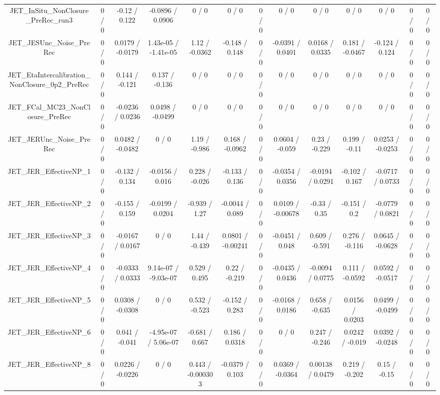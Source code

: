 \documentclass[10pt]{article}
\begin{document}
\begin{table}[htbp]
\begin{center}
\begin{tabular}{|c|c|c|c|c|c|c|c|c|c|c|c|c|}
  JET_InSitu_NonClosure_PreRec_run3 & 0 / 0 & -0.12 / 0.122 & -0.0896 / 0.0906 & 0 / 0 & 0 / 0 & 0 / 0 & 0 / 0 & 0 / 0 & 0 / 0 & 0 / 0 & 0 / 0 & 0 / 0 \\ 
  JET_JESUnc_Noise_PreRec & 0 / 0 & 0.0179 / -0.0179 & 1.43e-05 / -1.41e-05 & 1.12 / -0.0362 & -0.148 / 0.148 & 0 / 0 & -0.0391 / 0.0401 & 0.0168 / 0.0335 & 0.181 / -0.0467 & -0.124 / 0.124 & 0 / 0 & 0 / 0 \\ 
  JET_EtaIntercalibration_NonClosure_0p2_PreRec & 0 / 0 & 0.144 / -0.121 & 0.137 / -0.136 & 0 / 0 & 0 / 0 & 0 / 0 & 0 / 0 & 0 / 0 & 0 / 0 & 0 / 0 & 0 / 0 & 0 / 0 \\ 
  JET_FCal_MC23_NonClosure_PreRec & 0 / 0 & -0.0236 / 0.0236 & 0.0498 / -0.0499 & 0 / 0 & 0 / 0 & 0 / 0 & 0 / 0 & 0 / 0 & 0 / 0 & 0 / 0 & 0 / 0 & 0 / 0 \\ 
  JET_JERUnc_Noise_PreRec & 0 / 0 & 0.0482 / -0.0482 & 0 / 0 & 1.19 / -0.986 & 0.168 / -0.0962 & 0 / 0 & 0.0604 / -0.059 & 0.23 / -0.229 & 0.199 / -0.11 & 0.0253 / -0.0253 & 0 / 0 & 0 / 0 \\ 
  JET_JER_EffectiveNP_1 & 0 / 0 & -0.132 / 0.134 & -0.0156 / 0.016 & 0.228 / -0.026 & -0.133 / 0.136 & 0 / 0 & -0.0354 / 0.0356 & -0.0194 / 0.0291 & -0.102 / 0.167 & -0.0717 / 0.0733 & 0 / 0 & 0 / 0 \\ 
  JET_JER_EffectiveNP_2 & 0 / 0 & -0.155 / 0.159 & -0.0199 / 0.0204 & -0.939 / 1.27 & -0.0044 / 0.089 & 0 / 0 & 0.0109 / -0.00678 & -0.33 / 0.35 & -0.151 / 0.2 & -0.0779 / 0.0821 & 0 / 0 & 0 / 0 \\ 
  JET_JER_EffectiveNP_3 & 0 / 0 & -0.0167 / 0.0167 & 0 / 0 & 1.44 / -0.439 & 0.0801 / -0.00241 & 0 / 0 & -0.0451 / 0.048 & 0.609 / -0.591 & 0.276 / -0.116 & 0.0645 / -0.0628 & 0 / 0 & 0 / 0 \\ 
  JET_JER_EffectiveNP_4 & 0 / 0 & -0.0333 / 0.0333 & 9.14e-07 / -9.03e-07 & 0.529 / 0.495 & 0.22 / -0.219 & 0 / 0 & -0.0435 / 0.0436 & -0.0094 / 0.0775 & 0.111 / -0.0592 & 0.0592 / -0.0517 & 0 / 0 & 0 / 0 \\ 
  JET_JER_EffectiveNP_5 & 0 / 0 & 0.0308 / -0.0308 & 0 / 0 & 0.532 / -0.523 & -0.152 / 0.283 & 0 / 0 & -0.0168 / 0.0186 & 0.658 / -0.635 & 0.0156 / 0.0203 & 0.0499 / -0.0499 & 0 / 0 & 0 / 0 \\ 
  JET_JER_EffectiveNP_6 & 0 / 0 & 0.041 / -0.041 & -4.95e-07 / 5.06e-07 & -0.681 / 0.667 & 0.186 / 0.0318 & 0 / 0 & 0 / 0 & 0.247 / -0.246 & 0.0242 / -0.019 & 0.0392 / -0.0248 & 0 / 0 & 0 / 0 \\ 
  JET_JER_EffectiveNP_8 & 0 / 0 & 0.0226 / -0.0226 & 0 / 0 & 0.443 / -0.000303 & -0.0379 / 0.103 & 0 / 0 & 0.0369 / -0.0364 & 0.00138 / 0.0479 & 0.219 / -0.202 & 0.15 / -0.15 & 0 / 0 & 0 / 0 \\ 

\end{tabular}
\end{center}
\end{table}
\end{document}
